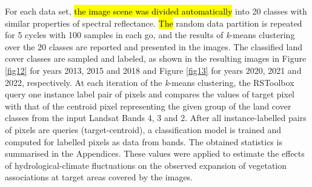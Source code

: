 \documentclass[12pt,a4paper,oneside]{article}
\def \newpar{\vspace{6pt}}
\begin{document}
\newpar For each data set, \hl{the image scene was divided automatically }into 20 classes with similar properties of spectral reflectance. \hl{The} random data partition is repeated for 5 cycles with 100 samples in each go, and the results of \emph{k}-means clustering over the 20 classes are reported and presented in the images. The classified land cover classes are sampled and labeled, as shown in the resulting images in Figure \ref{fig12} for years 2013, 2015 and 2018 and Figure \ref{fig13} for years 2020, 2021 and 2022, respectively. At each iteration of the \emph{k}-means clustering, the RSToolbox query one instance label pair of pixels and compares the values of target pixel with that of the centroid pixel representing the given group of the land cover classes from the input Landsat Bands 4, 3 and 2. After all instance-labelled pairs of pixels are queries (target-centroid), a classification model is trained and computed for labelled pixels as data from bands. The obtained statistics is summarised in the Appendices. These values were applied to estimate the effects of hydrological-climate fluctuations on the observed expansion of vegetation associations at target areas covered by the images. 
\end{document}
